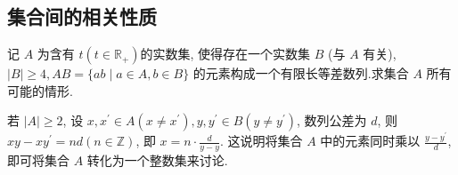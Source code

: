 \subsection	{集合间的相关性质}
\begin{example}
	记 $A$ 为含有 $t\left(t \in \mathbb{R}_{+}\right)$的实数集, 使得存在一个实数集 $B$ (与 $A$ 有关), $|B| \geqslant 4, A B=\{a b \mid a \in A, b \in B\}$ 的元素构成一个有限长等差数列.求集合 $A$ 所有可能的情形.
\end{example}
\begin{analysis}
	若 $|A| \geqslant 2$, 设 $x, x^{\prime} \in A\left(x \neq x^{\prime}\right), y, y^{\prime} \in B\left(y \neq y^{\prime}\right)$, 数列公差为 $d$, 则 $x y-x y^{\prime}=n d(n \in \mathbb{Z})$, 即 $x=n \cdot \frac{d}{y-y}$. 这说明将集合 $A$ 中的元素同时乘以 $\frac{y-y^{\prime}}{d}$, 即可将集合 $A$ 转化为一个整数集来讨论.
\end{analysis}
